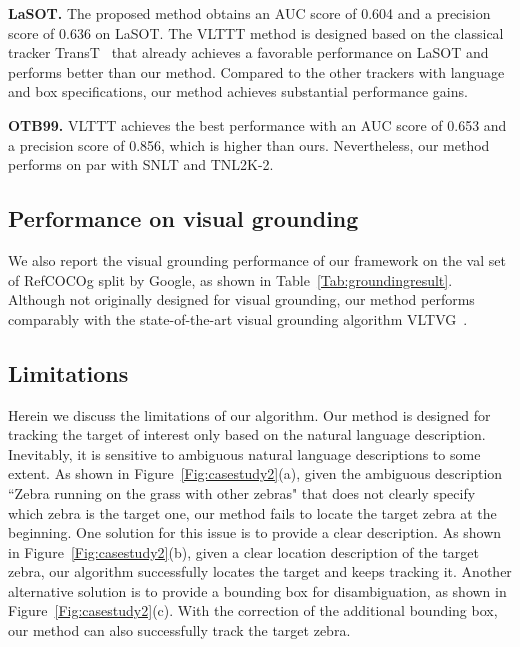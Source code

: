 \noindent\textbf{LaSOT.}
The proposed method obtains an AUC score of 0.604 and a precision score of  0.636 on LaSOT.
The VLTTT method is designed based on the classical tracker TransT~\cite{chen2021transformer} that already achieves a favorable performance on LaSOT and performs better than our method. 
Compared to the other trackers with language and box specifications, our method achieves substantial performance gains.

\noindent\textbf{OTB99.}
VLTTT achieves the best performance with an AUC score of 0.653 and a precision score of 0.856, which is higher than ours. 
Nevertheless, our method performs on par with SNLT and TNL2K-2.

\subsection{Performance on visual grounding}\label{grounding}
We also report the visual grounding performance of our framework on the val set of RefCOCOg split by Google, as shown in Table~\ref{Tab:groundingresult}.
Although not originally designed for visual grounding, our method performs comparably with the state-of-the-art visual grounding algorithm VLTVG~\cite{VLTVG}.

\subsection{Limitations}
Herein we discuss the limitations of our algorithm. 
Our method is designed for tracking the target of interest only based on the natural language description. 
Inevitably, it is sensitive to ambiguous natural language descriptions to some extent. As shown in Figure~\ref{Fig:casestudy2}(a), given the ambiguous description ``Zebra running on the grass with other zebras" that does not clearly specify which zebra is the target one, our method fails to locate the target zebra at the beginning. 
One solution for this issue is to provide a clear description. 
As shown in Figure~\ref{Fig:casestudy2}(b), given a clear location description of the target zebra, our algorithm successfully locates the target and keeps tracking it. 
Another alternative solution is to provide a bounding box for disambiguation, as shown in Figure~\ref{Fig:casestudy2}(c). With the correction of the additional bounding box, our method can also successfully track the target zebra.

